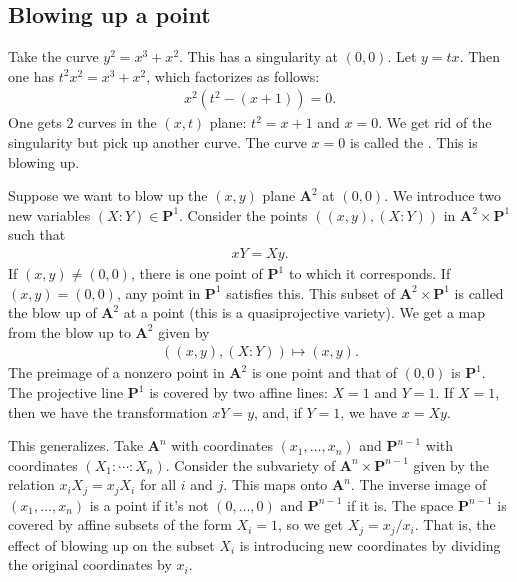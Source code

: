 \documentclass [11 pt, oneside] {article}
\begin{document}
\subsection{Blowing up a point}
\begin{example}[ ]\label{}
Take the curve $y^2 = x^3 +x^2$. This has a singularity at $(0,0)$. Let $y=tx$. Then one has $t^2x^2 = x^3+x^2$, which factorizes as follows:
\begin{align*}
x^2(t^2 - (x+1)) =0.
\end{align*}
One gets $2$ curves in the $(x,t)$ plane: $t^2=x+1$ and $x=0$. We get rid of the singularity but pick up another curve. The curve $x=0$ is called the . This is blowing up.
\end{example}


Suppose we want to blow up the $(x,y)$ plane $\mathbf{A}^2$ at $(0,0)$. We introduce two new variables $(X:Y)\in  \mathbf{P}^1$. Consider the points $((x,y),  (X:Y))$ in $\mathbf{A}^2\times \mathbf{P}^1$ such that 
\begin{align*}
	xY = Xy.
\end{align*}
If $(x,y)\ne (0,0)$, there is one point of $\mathbf{P}^1$ to which it corresponds. If $(x,y)= (0,0)$, any point in $\mathbf{P}^1$ satisfies this. This subset of $\mathbf{A}^2\times \mathbf{P}^1$ is called the blow up of $\mathbf{A}^2$ at a point (this is a quasiprojective variety). We get a map from the blow up to $\mathbf{A}^2$ given by
\begin{align*}
	((x,y), (X:Y)) \longmapsto (x,y).
\end{align*}
The preimage of a nonzero point in $\mathbf{A}^2$ is one point and that of $(0,0)$ is $\mathbf{P}^1$. The projective line $\mathbf{P}^1$ is covered by two affine lines: $X = 1$ and $Y=1$. If $X=1$, then we have the transformation $xY=y$, and, if $Y=1$, we have $x = Xy$.

This generalizes. Take $\mathbf{A}^n$ with coordinates $(x_1,\hdots, x_n)$ and $\mathbf{P}^{n-1}$ with coordinates $(X_1:\cdots : X_n)$. Consider the subvariety of $\mathbf{A}^n\times \mathbf{P}^{n-1}$ given by the relation $x_iX_j = x_jX_i$ for all $i$ and $j$. This maps onto $\mathbf{A}^n$. The inverse image of $(x_1,\hdots, x_n)$ is a point if it's not $(0,\hdots, 0)$ and $\mathbf{P}^{n-1}$ if it is. The space $\mathbf{P}^{n-1}$ is covered by affine subsets of the form $X_i=1$, so we get $X_j = x_j/x_i$. That is, the effect of blowing up on the subset $X_i$ is introducing new coordinates by dividing the original coordinates by $x_i$.
\end{document}
